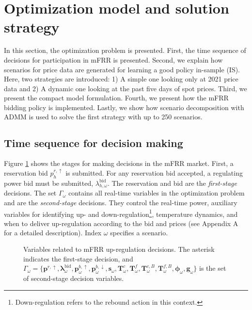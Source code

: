 \section{Optimization model and solution strategy}\label{sec:OptimizationModel}

In this section, the optimization problem is presented. First, the time sequence of decisions for participation in mFRR is presented. Second, we explain how scenarios for price data are generated for learning a good policy in-sample (IS). Here, two strategies are introduced: 1) A simple one looking only at 2021 price data and 2) A dynamic one looking at the past five days of spot prices. Third, we present the compact model formulation. Fourth, we present how the mFRR bidding policy is implemented. Lastly, we show how scenario decomposition with ADMM is used to solve the first strategy with up to 250 scenarios.

\subsection{Time sequence for decision making}

Figure \ref{fig:timeline_mfrr_variables} shows the stages for making decisions in the mFRR market. First, a reservation bid $p_{h}^{r,\uparrow}$ is submitted. For any reservation bid accepted, a regulating power bid must be submitted, $\lambda_{h,\omega}^{\text{bid}}$. The reservation and bid are the \textit{first-stage} decisions. The set $\Gamma_{\omega}$ contains all real-time variables in the optimization problem and are the \textit{second-stage} decisions. They control the real-time power, auxiliary variables for identifying up- and down-regulation\footnote{Down-regulation refers to the rebound action in this context.}, temperature dynamics, and when to deliver up-regulation according to the bid and prices (see Appendix A for a detailed description). Index $\omega$ specifies a scenario.

\begin{figure}[!t]
    \centering
    
    \caption{Variables related to mFRR up-regulation decisions. The asterisk indicates the first-stage decision, and \\ $\Gamma_{\omega} = \{ \bm{p}^{r,\uparrow}, \bm{\lambda}_{\omega}^{\text{bid}}, \bm{p}_{\omega}^{b,\uparrow}, \bm{p}_{\omega}^{b,\downarrow}, \bm{s}_{\omega}, \bm{T}_{\omega}^{c}, \bm{T}_{\omega}^{f}, \bm{T}_{\omega}^{c, B}, \bm{T}_{\omega}^{f,B}, \bm{\phi}_{\omega}, \bm{g}_{\omega} \}$ is the set of second-stage decision variables.}
    \label{fig:timeline_mfrr_variables}
\end{figure}

